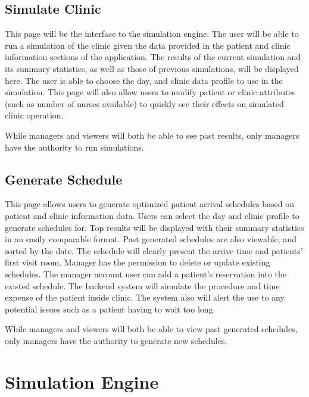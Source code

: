 \documentclass[12pt]{article}
\begin{document}
\subsection{Simulate Clinic}
This page will be the interface to the simulation engine. The user will be able to run a simulation of the clinic given the data provided in the patient and clinic information sections of the application. The results of the current simulation and its summary statistics, as well as those of previous simulations, will be displayed here. The user is able to choose the day, and clinic data profile to use in the simulation. This page will also allow users to modify patient or clinic attributes (such as number of nurses available) to quickly see their effects on simulated clinic operation. 

\noindent \newline
While managers and viewers will both be able to see past results, only managers have the authority to run simulations.

\subsection{Generate Schedule}
This page allows users to generate optimized patient arrival schedules based on patient and clinic information data. Users can select the day and clinic profile to generate schedules for. Top results will be displayed with their summary statistics in an easily comparable format. Past generated schedules are also viewable, and sorted by the date. The schedule will clearly present the arrive time and patients’ first visit room.  Manager has the permission to delete or update existing schedules. The manager account user can add a patient’s reservation into the existed schedule. The backend system will simulate the procedure and time expense of the patient inside clinic. The system also will alert the use to any potential issues such as a patient having to wait too long.

\noindent \newline
While managers and viewers will both be able to view past generated schedules, only managers have the authority to generate new schedules.




\section{Simulation Engine}
\end{document}
